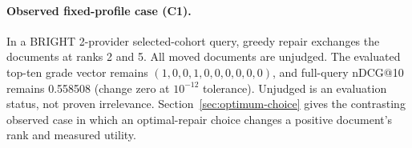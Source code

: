 \paragraph{Observed fixed-profile case (C1).} In a BRIGHT 2-provider selected-cohort query, greedy repair exchanges the documents at ranks 2 and 5. All moved documents are unjudged. The evaluated top-ten grade vector remains $({1,0,0,1,0,0,0,0,0,0})$, and full-query nDCG@10 remains 0.558508 (change zero at $10^{-12}$ tolerance). Unjudged is an evaluation status, not proven irrelevance. Section~\ref{sec:optimum-choice} gives the contrasting observed case in which an optimal-repair choice changes a positive document's rank and measured utility.

